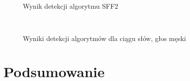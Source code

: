 \documentclass[eng,printmode]{mgr}
\begin{document}
\begin{figure}
\begin{center}
		\caption{Wynik detekcji algorytmu SFF2}\vspace{5mm}
	\end{center}
\end{figure}


\begin{figure}
	\footnotesize
	\begin{center}
		$
		$
		\caption{Wyniki detekcji algorytmów dla ciągu słów, głos męski}
	\end{center}
	
\end{figure}
\chapter{Podsumowanie}

%


 \listoffigures
 \listoftables
\end{document}

